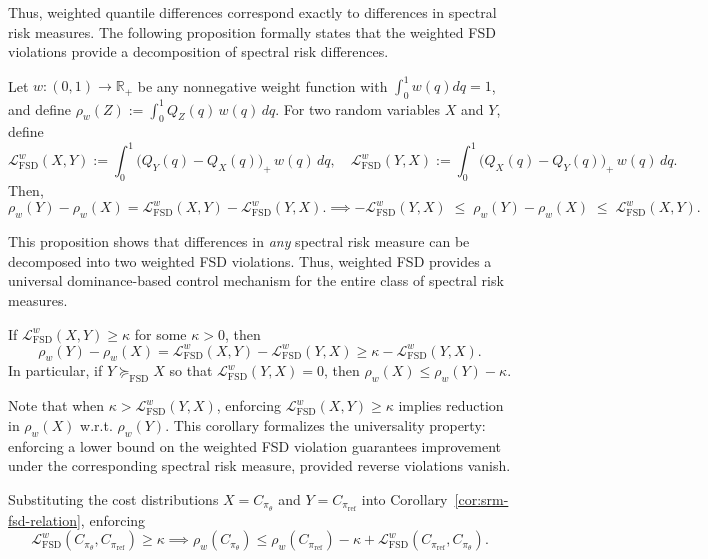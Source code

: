 Thus, weighted quantile differences correspond exactly to differences in spectral risk measures.
The following proposition formally states that the weighted FSD violations provide a decomposition of spectral risk differences.

\begin{proposition}
  Let $w : (0,1) \to \mathbb{R}_{+}$ be any nonnegative weight function with $\int_0^1 w(q) dq = 1$, and define
  \(
    \rho_w(Z) := \int_0^1 Q_Z(q)\, w(q)\, dq .
  \)
  For two random variables $X$ and $Y$, define
  {\small
    \[
      \mathcal{L}_{\mathrm{FSD}}^{w}(X,Y)
      :=
      \int_0^1 \big(Q_Y(q) - Q_X(q)\big)_+\, w(q)\, dq,
      \quad
      \mathcal{L}_{\mathrm{FSD}}^{w}(Y,X)
      :=
      \int_0^1 \big(Q_X(q) - Q_Y(q)\big)_+\, w(q)\, dq.
    \]
  }
  Then,
  {\small
    \[
      \rho_w(Y) - \rho_w(X)
      =
      \mathcal{L}_{\mathrm{FSD}}^{w}(X,Y)
      -
      \mathcal{L}_{\mathrm{FSD}}^{w}(Y,X).
      \implies
      - \mathcal{L}_{\mathrm{FSD}}^{w}(Y,X)
      \;\le\;
      \rho_w(Y) - \rho_w(X)
      \;\le\;
      \mathcal{L}_{\mathrm{FSD}}^{w}(X,Y).
    \]
  }
\end{proposition}

This proposition shows that differences in \emph{any} spectral risk measure can be decomposed into two weighted FSD violations.
Thus, weighted FSD provides a universal dominance-based control mechanism for the entire class of spectral risk measures.
\begin{corollary}
  If $\mathcal{L}_{\mathrm{FSD}}^w(X,Y) \geq \kappa$ for some $\kappa > 0$, then
  \[
    \rho_w(Y) - \rho_w(X)
    =
    \mathcal{L}_{\mathrm{FSD}}^w(X,Y)
    -
    \mathcal{L}_{\mathrm{FSD}}^w(Y,X)
    \ge
    \kappa
    -
    \mathcal{L}_{\mathrm{FSD}}^w(Y,X).
  \]
  In particular, if $Y \succeq_{\mathrm{FSD}} X$ so that
  $\mathcal{L}_{\mathrm{FSD}}^w(Y,X) = 0$, then
  \(
    \rho_w(X)
    \le
    \rho_w(Y) - \kappa.
  \)
  \label{cor:srm-fsd-relation}
\end{corollary}
Note that when $\kappa>\mathcal{L}_{\mathrm{FSD}}^w(Y,X)$, enforcing $\mathcal{L}_{\mathrm{FSD}}^w(X,Y) \geq \kappa$ implies reduction in $\rho_w(X)$ w.r.t. $\rho_w(Y)$.
This corollary formalizes the universality property:
enforcing a lower bound on the weighted FSD violation guarantees improvement under the corresponding spectral risk measure, provided reverse violations vanish.

Substituting the cost distributions $X = C_{\pi_{\theta}}$ and
$Y = C_{\pi_{\mathrm{ref}}}$ into Corollary~\ref{cor:srm-fsd-relation}, enforcing
\[
  \mathcal{L}_{\mathrm{FSD}}^w(C_{\pi_{\theta}},C_{\pi_{\mathrm{ref}}}) \ge \kappa
  \implies
  \rho_w\!\left(C_{\pi_{\theta}}\right)
  \le
  \rho_w\!\left(C_{\pi_{\mathrm{ref}}}\right)
  -
  \kappa
  +
  \mathcal{L}_{\mathrm{FSD}}^w(C_{\pi_{\mathrm{ref}}},C_{\pi_{\theta}}).
\]

